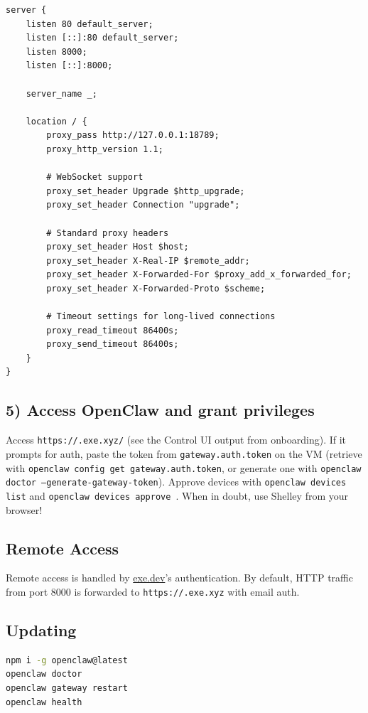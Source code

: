 \begin{lstlisting}
server {
    listen 80 default_server;
    listen [::]:80 default_server;
    listen 8000;
    listen [::]:8000;

    server_name _;

    location / {
        proxy_pass http://127.0.0.1:18789;
        proxy_http_version 1.1;

        # WebSocket support
        proxy_set_header Upgrade $http_upgrade;
        proxy_set_header Connection "upgrade";

        # Standard proxy headers
        proxy_set_header Host $host;
        proxy_set_header X-Real-IP $remote_addr;
        proxy_set_header X-Forwarded-For $proxy_add_x_forwarded_for;
        proxy_set_header X-Forwarded-Proto $scheme;

        # Timeout settings for long-lived connections
        proxy_read_timeout 86400s;
        proxy_send_timeout 86400s;
    }
}
\end{lstlisting}


\subsection{5) Access OpenClaw and grant privileges}


Access \texttt{https://.exe.xyz/} (see the Control UI output from onboarding). If it prompts for auth, paste the
token from \texttt{gateway.auth.token} on the VM (retrieve with \texttt{openclaw config get gateway.auth.token}, or generate one
with \texttt{openclaw doctor --generate-gateway-token}). Approve devices with \texttt{openclaw devices list} and
\texttt{openclaw devices approve }. When in doubt, use Shelley from your browser!

\subsection{Remote Access}


Remote access is handled by \href{https://exe.dev}{exe.dev}'s authentication. By
default, HTTP traffic from port 8000 is forwarded to \texttt{https://.exe.xyz}
with email auth.

\subsection{Updating}


\begin{lstlisting}[language=bash]
npm i -g openclaw@latest
openclaw doctor
openclaw gateway restart
openclaw health
\end{lstlisting}


